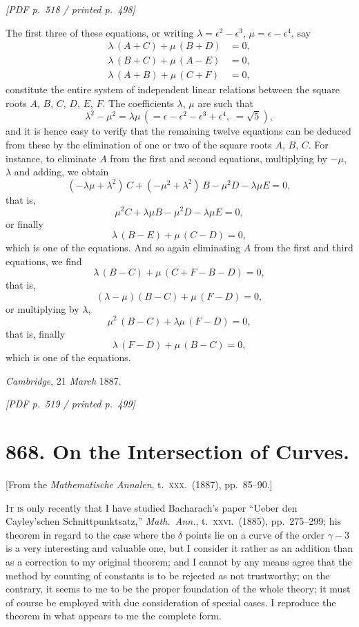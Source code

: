 \documentclass[11pt]{article}
\begin{document}
\vfill
\noindent\textit{[PDF p.~518 / printed p.~498]}
\newpage

\noindent The first three of these equations, or writing $\lambda = \epsilon^{2} - \epsilon^{3}$, $\mu = \epsilon - \epsilon^{4}$, say
\begin{align*}
\lambda\,(A + C) + \mu\,(B + D) &= 0, \\
\lambda\,(B + C) + \mu\,(A - E) &= 0, \\
\lambda\,(A + B) + \mu\,(C + F) &= 0,
\end{align*}
constitute the entire system of independent linear relations between the square roots $A$, $B$, $C$, $D$, $E$, $F$. The coefficients $\lambda$, $\mu$ are such that
\[
\lambda^{2} - \mu^{2} = \lambda\mu\,(=\epsilon - \epsilon^{2} - \epsilon^{3} + \epsilon^{4},\;= \sqrt{5}),
\]
and it is hence easy to verify that the remaining twelve equations can be deduced from these by the elimination of one or two of the square roots $A$, $B$, $C$. For instance, to eliminate $A$ from the first and second equations, multiplying by $-\mu$, $\lambda$ and adding, we obtain
\[
(-\lambda\mu + \lambda^{2})\,C + (-\mu^{2} + \lambda^{2})\,B - \mu^{2}D - \lambda\mu E = 0,
\]
that is,
\[
\mu^{2}C + \lambda\mu B - \mu^{2}D - \lambda\mu E = 0,
\]
or finally
\[
\lambda\,(B - E) + \mu\,(C - D) = 0,
\]
which is one of the equations. And so again eliminating $A$ from the first and third equations, we find
\[
\lambda\,(B - C) + \mu\,(C + F - B - D) = 0,
\]
that is,
\[
(\lambda - \mu)(B - C) + \mu\,(F - D) = 0,
\]
or multiplying by $\lambda$,
\[
\mu^{2}\,(B - C) + \lambda\mu\,(F - D) = 0,
\]
that is, finally
\[
\lambda\,(F - D) + \mu\,(B - C) = 0,
\]
which is one of the equations.

\medskip

\noindent\textit{Cambridge}, 21 \textit{March} 1887.

\vfill
\noindent\textit{[PDF p.~519 / printed p.~499]}
\newpage

\section*{868. On the Intersection of Curves.}

\begin{flushright}\small
[From the \textit{Mathematische Annalen}, t.~\textsc{xxx}.\ (1887), pp.~85--90.]
\end{flushright}

\medskip

\noindent\textsc{It is} only recently that I have studied Bacharach's paper ``Ueber den Cayley'schen Schnittpunktsatz,'' \textit{Math.\ Ann.}, t.~\textsc{xxvi}.\ (1885), pp.~275--299; his theorem in regard to the case where the $\delta$ points lie on a curve of the order $\gamma - 3$ is a very interesting and valuable one, but I consider it rather as an addition than as a correction to my original theorem; and I cannot by any means agree that the method by counting of constants is to be rejected as not trustworthy; on the contrary, it seems to me to be the proper foundation of the whole theory; it must of course be employed with due consideration of special cases. I reproduce the theorem in what appears to me the complete form.
\end{document}
